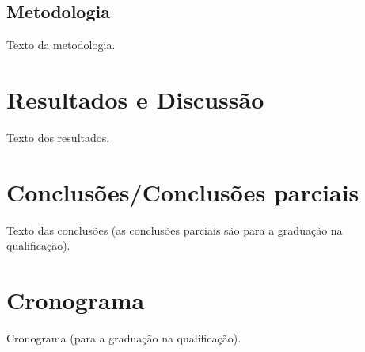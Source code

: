 \documentclass[
	article,			%
	11pt,				%
	oneside,			%
	a4paper,			%
	chapter=TITLE,		%
	section=TITLE,		%
	english,			%
	brazil,				%
	sumario=tradicional
]{abntex2}
\begin{document}
     
     
     
     \subsection{Metodologia}
     
     Texto da metodologia.
     
     
     
     
     

	\section{Resultados e Discussão}
    	
     Texto dos resultados.
     
     
     

	\section{Conclusões/Conclusões parciais}
	
	Texto das conclusões (as conclusões parciais são para a graduação na qualificação).
    
    
    

	\section{Cronograma}
	
	Cronograma (para a graduação na qualificação).
	
	
	\postextual
	
	
	
\end{document}
